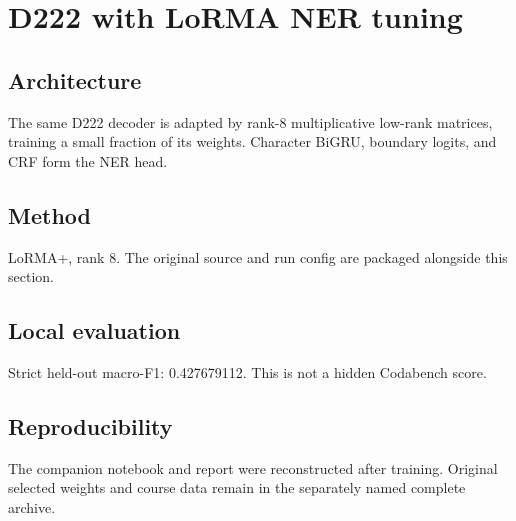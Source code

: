 \section{D222 with LoRMA NER tuning}
\subsection{Architecture}
The same D222 decoder is adapted by rank-8 multiplicative low-rank matrices, training a small fraction of its weights. Character BiGRU, boundary logits, and CRF form the NER head.
\subsection{Method}
LoRMA+, rank 8. The original source and run config are packaged alongside this section.
\subsection{Local evaluation}
Strict held-out macro-F1: 0.427679112. This is not a hidden Codabench score.
\subsection{Reproducibility}
The companion notebook and report were reconstructed after training. Original selected weights and course data remain in the separately named complete archive.
